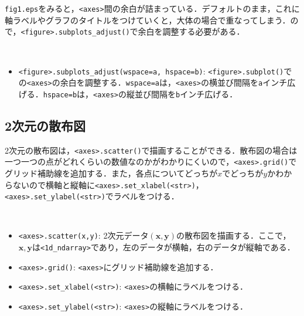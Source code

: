 \texttt{fig1.eps}をみると，\texttt{<axes>}間の余白が詰まっている．デフォルトのまま，これに軸ラベルやグラフのタイトルをつけていくと，大体の場合で重なってしまう．ので，\texttt{<figure>.subplots\_adjust()}で余白を調整する必要がある．
\begin{gram}　
\begin{itemize}
\item \texttt{<figure>.subplots\_adjust(wspace=a, hspace=b)}: \texttt{<figure>.subplot()}での\texttt{<axes>}の余白を調整する．\texttt{wspace=a}は，\texttt{<axes>}の横並び間隔を\texttt{a}インチ広げる．\texttt{hspace=b}は，\texttt{<axes>}の縦並び間隔を\texttt{b}インチ広げる．
\end{itemize}
\end{gram}
\begin{cod}[\texttt{fig7.py}]　
}]{code/fig7.py}
\vspace{-19pt}
\begin{figure}[H]
\begin{center}
\framed
\texttt{[image: code/fig7.eps]}
\vspace{-16pt}
\caption{\texttt{fig7.eps}}
\endframed
\end{center}
\end{figure}
\end{cod}
\vspace{-20pt}
\subsection{2次元の散布図}

2次元の散布図は，\texttt{<axes>.scatter()}で描画することができる．散布図の場合は一つ一つの点がどれくらいの数値なのかがわかりにくいので，\texttt{<axes>.grid()}でグリッド補助線を追加する．また，各点についてどっちが$x$でどっちが$y$かわからないので横軸と縦軸に\texttt{<axes>.set\_xlabel(<str>)}，\texttt{<axes>.set\_ylabel(<str>)}でラベルをつける．
\begin{gram}　
\begin{itemize}
\item \texttt{<axes>.scatter(x,y)}: 2次元データ$(\bm{x},\bm{y})$の散布図を描画する．ここで，$\bm{x},\bm{y}$は\texttt{<1d\_ndarray>}であり，左のデータが横軸，右のデータが縦軸である．
\item \texttt{<axes>.grid()}: \texttt{<axes>}にグリッド補助線を追加する．
\item \texttt{<axes>.set\_xlabel(<str>)}: \texttt{<axes>}の横軸にラベルをつける．
\item \texttt{<axes>.set\_ylabel(<str>)}: \texttt{<axes>}の縦軸にラベルをつける．
\end{itemize}
\end{gram}

